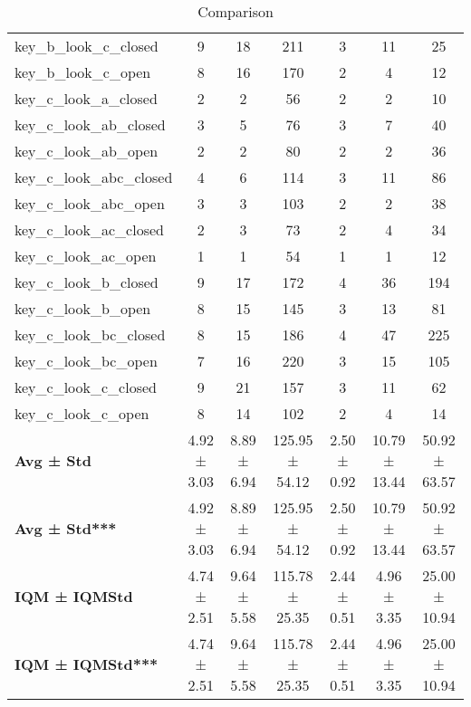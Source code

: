 \begin{table}[!ht]
\begin{tabular}{l|ccc|ccc}
key\_b\_look\_c\_closed & 9 & 18 & 211 & 3 & 11 & 25 \\
key\_b\_look\_c\_open & 8 & 16 & 170 & 2 & 4 & 12 \\
key\_c\_look\_a\_closed & 2 & 2 & 56 & 2 & 2 & 10 \\
key\_c\_look\_ab\_closed & 3 & 5 & 76 & 3 & 7 & 40 \\
key\_c\_look\_ab\_open & 2 & 2 & 80 & 2 & 2 & 36 \\
key\_c\_look\_abc\_closed & 4 & 6 & 114 & 3 & 11 & 86 \\
key\_c\_look\_abc\_open & 3 & 3 & 103 & 2 & 2 & 38 \\
key\_c\_look\_ac\_closed & 2 & 3 & 73 & 2 & 4 & 34 \\
key\_c\_look\_ac\_open & 1 & 1 & 54 & 1 & 1 & 12 \\
key\_c\_look\_b\_closed & 9 & 17 & 172 & 4 & 36 & 194 \\
key\_c\_look\_b\_open & 8 & 15 & 145 & 3 & 13 & 81 \\
key\_c\_look\_bc\_closed & 8 & 15 & 186 & 4 & 47 & 225 \\
key\_c\_look\_bc\_open & 7 & 16 & 220 & 3 & 15 & 105 \\
key\_c\_look\_c\_closed & 9 & 21 & 157 & 3 & 11 & 62 \\
key\_c\_look\_c\_open & 8 & 14 & 102 & 2 & 4 & 14 \\
\hline
\textbf{Avg ± Std} & 4.92 ± 3.03 & 8.89 ± 6.94 & 125.95 ± 54.12 & 2.50 ± 0.92 & 10.79 ± 13.44 & 50.92 ± 63.57 \\
\textbf{Avg ± Std***} & 4.92 ± 3.03 & 8.89 ± 6.94 & 125.95 ± 54.12 & 2.50 ± 0.92 & 10.79 ± 13.44 & 50.92 ± 63.57 \\
\textbf{IQM ± IQMStd} & 4.74 ± 2.51 & 9.64 ± 5.58 & 115.78 ± 25.35 & 2.44 ± 0.51 & 4.96 ± 3.35 & 25.00 ± 10.94 \\
\textbf{IQM ± IQMStd***} & 4.74 ± 2.51 & 9.64 ± 5.58 & 115.78 ± 25.35 & 2.44 ± 0.51 & 4.96 ± 3.35 & 25.00 ± 10.94 \\
\end{tabular}
\caption{Comparison}
\label{tab:batch3_CoinBox_pl__3_comparison_test}
\end{table}
